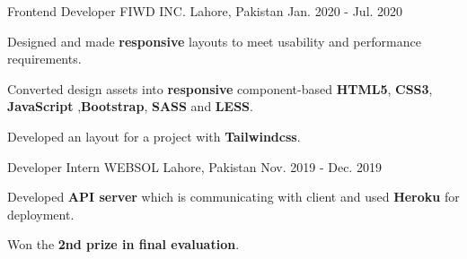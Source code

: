 \begin{cventries}
  \cventry
    {Frontend Developer} %
    {FIWD INC.} %
    {Lahore, Pakistan} %
    {Jan. 2020 - Jul. 2020} %
    {
      \begin{cvitems} %
        \item {Designed and made \textbf{responsive} layouts to meet usability and performance requirements.}
        \item {Converted design assets into \textbf{responsive} component-based \textbf{HTML5}, \textbf{CSS3}, \textbf{JavaScript} ,\textbf{Bootstrap}, \textbf{SASS} and \textbf{LESS}.}
        \item {Developed an layout for a project with \textbf{Tailwindcss}.}
        \end{cvitems}
    }

  \cventry
    {Developer Intern} %
    {WEBSOL} %
    {Lahore, Pakistan} %
    {Nov. 2019 - Dec. 2019} %
    {
      \begin{cvitems} %
        \item {Developed \textbf{API server} which is communicating with client and used \textbf{Heroku} for deployment.}
        \item {Won the \textbf{2nd prize in final evaluation}.}
      \end{cvitems}
    }

\end{cventries}
